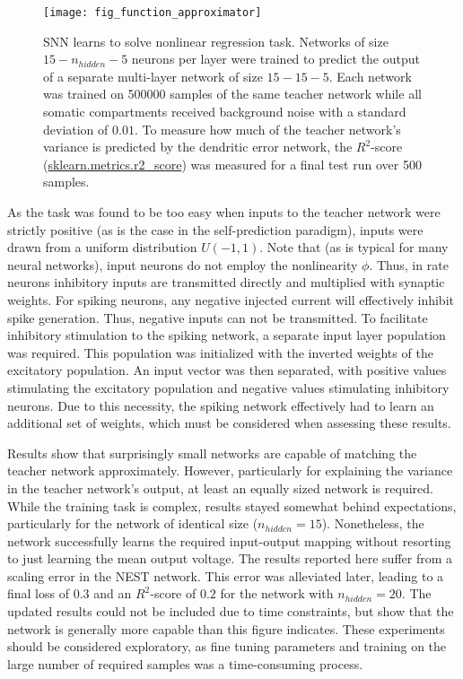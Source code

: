 \begin{figure}[h]
    \centering
    \texttt{[image: fig\_function\_approximator]}
    \caption[SNN learns to solve nonlinear regression task.]{SNN learns to solve nonlinear regression task. Networks of
    size $15-n_{hidden}-5$ neurons per layer were trained to predict the output of a separate multi-layer network of
    size $15-15-5$. Each network was trained on 500000 samples of the same teacher network while all somatic
    compartments received background noise with a standard deviation of $0.01$. To measure how much of the teacher
    network's variance is predicted by the dendritic error network, the $R^2$-score
    (\href{https://scikit-learn.org/stable/modules/generated/sklearn.metrics.r2_score.html}{sklearn.metrics.r2\_score})
    was measured for a final test run over 500 samples.}
    \label{fig-func-approx}
\end{figure}

As the task was found to be too easy when inputs to the teacher network were strictly positive (as is the case in the
self-prediction paradigm), inputs were drawn from a uniform distribution $U(-1,1)$. Note that (as is typical for many
neural networks), input neurons do not employ the nonlinearity $\phi$. Thus, in rate neurons inhibitory inputs are
transmitted directly and multiplied with synaptic weights. For spiking neurons, any negative injected current will
effectively inhibit spike generation. Thus, negative inputs can not be transmitted. To facilitate inhibitory stimulation
to the spiking network, a separate input layer population was required. This population was initialized with the
inverted weights of the excitatory population. An input vector was then separated, with positive values stimulating the
excitatory population and negative values stimulating inhibitory neurons. Due to this necessity, the spiking network
effectively had to learn an additional set of weights, which must be considered when assessing these results.

Results show that surprisingly small networks are capable of matching the teacher network approximately. However,
particularly for explaining the variance in the teacher network's output, at least an equally sized network  is
required. While the training task is complex, results stayed somewhat behind expectations, particularly for the network
of identical size ($n_{hidden} = 15$). Nonetheless, the network successfully learns the required input-output mapping
without resorting to just learning the mean output voltage. The results reported here suffer from a scaling error in the
NEST network. This error was alleviated later, leading to a final loss of $0.3$ and an $R^2$-score of $0.2$ for the
network with $n_{hidden} = 20$. The updated results could not be included due to time constraints, but show that the
network is generally more capable than this figure indicates. These experiments should be considered exploratory, as
fine tuning parameters and training on the large number of required samples was a time-consuming process.



